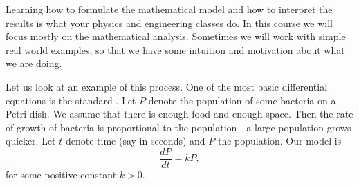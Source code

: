 Learning how to formulate the mathematical model and how to interpret the
results is what your physics and engineering classes do.  In this
course we will focus mostly on the mathematical analysis.  Sometimes we will
work with simple real world examples, so that we have some intuition and
motivation about what we are doing.

Let us look at 
an example of this process.
One of the most basic differential equations
is the standard \emph{}.
Let $P$ denote the population 
of some bacteria on a Petri dish.  We assume that there is enough food
and enough space.  Then the rate of growth of bacteria is proportional
to the population---a large population grows quicker.  Let $t$ denote
time (say in seconds) and $P$ the population.  Our model
is
\begin{equation*}
\frac{dP}{dt} = kP ,
\end{equation*}
for some positive constant $k > 0$.


